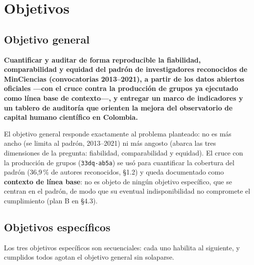 \section{Objetivos}

\subsection{Objetivo general}

\textbf{Cuantificar y auditar de forma reproducible la fiabilidad,
comparabilidad y equidad del padrón de investigadores reconocidos de
MinCiencias (convocatorias 2013--2021), a partir de los datos abiertos
oficiales —con el cruce contra la producción de grupos ya ejecutado como
línea base de contexto—, y entregar un marco de indicadores y un tablero de
auditoría que orienten la mejora del observatorio de capital humano científico
en Colombia.}

El objetivo general responde exactamente al problema planteado: no es más
ancho (se limita al padrón, 2013--2021) ni más
angosto (abarca las tres dimensiones de la pregunta: fiabilidad,
comparabilidad y equidad). El cruce con la producción de grupos
(\texttt{33dq-ab5a}) se usó para cuantificar la cobertura del padrón
(36,9\,\% de autores reconocidos, §1.2) y queda documentado como
\textbf{contexto de línea base}: no es objeto de ningún objetivo específico,
que se centran en el padrón, de modo que su eventual indisponibilidad no
compromete el cumplimiento (plan B en §4.3).

\subsection{Objetivos específicos}

Los tres objetivos específicos son secuenciales: cada uno habilita al
siguiente, y cumplidos todos agotan el objetivo general sin solaparse.

